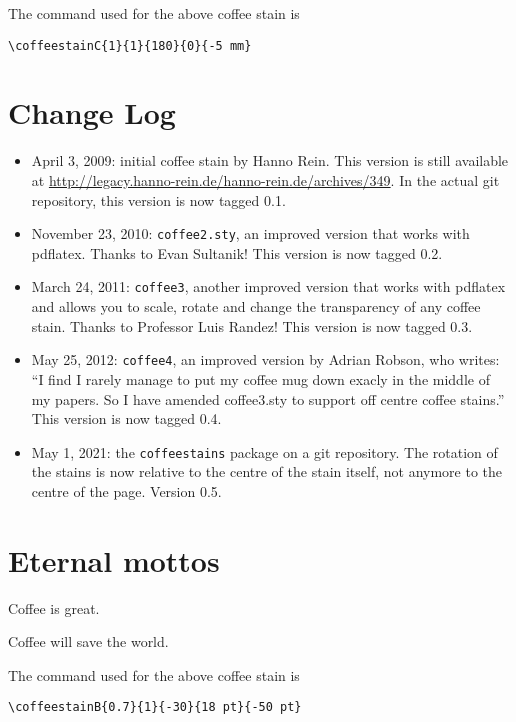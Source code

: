 \documentclass[a4paper, 11pt, BCOR = 0 pt, oneside, english]{scrartcl}
\begin{document}
\vfill{}

\begin{tcolorbox}
  The command used for the above coffee stain is

  \verb|\coffeestainC{1}{1}{180}{0}{-5 mm}|
\end{tcolorbox}
\newpage{}
\section{Change Log}
\begin{itemize}
\item April 3, 2009: initial coffee stain by Hanno Rein. This version is still
  available at \url{http://legacy.hanno-rein.de/hanno-rein.de/archives/349}. In the actual git repository,
  this version is now tagged 0.1.
\item November 23, 2010: \texttt{coffee2.sty}, an improved version that works
  with pdflatex. Thanks to Evan Sultanik! This version is now tagged 0.2.
\item March 24, 2011: \texttt{coffee3}, another improved version that works
  with pdflatex and allows you to scale, rotate and change the transparency of
  any coffee stain. Thanks to Professor Luis Randez! This version is now tagged
  0.3.
\item May 25, 2012: \texttt{coffee4}, an improved version by Adrian Robson, who
  writes: “I find I rarely manage to put my coffee mug down exacly in the middle
  of my papers.  So I have amended coffee3.sty to support off centre coffee
  stains.” This version is now tagged 0.4.
\item May 1, 2021: the \texttt{coffeestains} package on a git
  repository. The rotation of the stains is now relative to the centre of the
  stain itself, not anymore to the centre of the page. Version 0.5.
\end{itemize}

\label{stainB}

\section{Eternal mottos}

Coffee is great.

\vspace{5mm}

\noindent
Coffee will save the world.

\vfill{}

\begin{tcolorbox}
  The command used for the above coffee stain is

  \verb|\coffeestainB{0.7}{1}{-30}{18 pt}{-50 pt}|
\end{tcolorbox}
\end{document}

